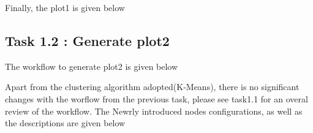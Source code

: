\documentclass[11pt]{article}
\begin{document}
			\fi
			Finally, the plot1 is given below

		\subsection*{Task 1.2 : Generate plot2}
			The workflow to generate plot2 is given below

			Apart from the clustering algorithm adopted(K-Means), there is no significant changes with the worflow from the previous task, please see task1.1 for an overal review of the workflow. The Newrly introduced nodes configurations, as well as the descriptions are given below
			
\end{document}
